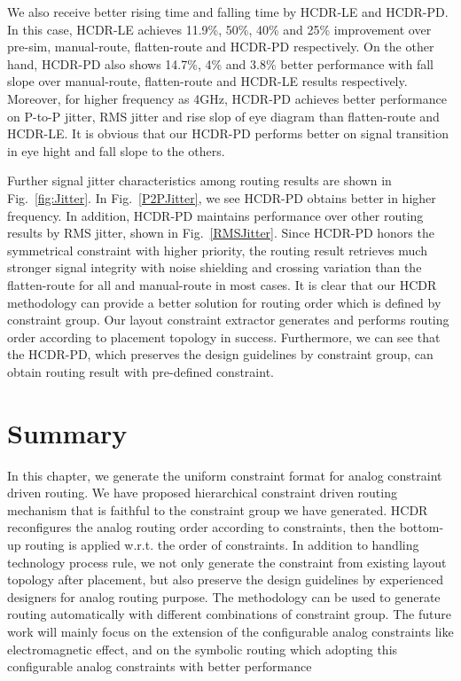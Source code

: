     We also receive better rising time and falling time by HCDR-LE and HCDR-PD. In this case, HCDR-LE achieves 11.9\%, 50\%, 40\% and 25\% improvement over pre-sim, manual-route, flatten-route and HCDR-PD respectively. On the other hand, HCDR-PD also shows 14.7\%, 4\% and 3.8\% better performance with fall slope over manual-route, flatten-route and HCDR-LE results respectively. Moreover, for higher frequency as 4GHz, HCDR-PD achieves better performance on P-to-P jitter, RMS jitter and rise slop of eye diagram than flatten-route and HCDR-LE. It is obvious that our HCDR-PD performs better on signal transition in eye hight and fall slope to the others. 
    
    Further signal jitter characteristics among routing results are shown in Fig.~\ref{fig:Jitter}. In Fig.~\ref{P2PJitter}, we see HCDR-PD obtains better in higher frequency. In addition, HCDR-PD maintains performance over other routing results by RMS jitter, shown in Fig.~\ref{RMSJitter}. Since HCDR-PD honors the symmetrical constraint with higher priority, the routing result retrieves much stronger signal integrity with noise shielding and crossing variation than the flatten-route for all and manual-route in most cases. It is clear that our HCDR methodology can provide a better solution for routing order which is defined by constraint group. Our layout constraint extractor generates and performs routing order according to placement topology in success. Furthermore, we can see that the HCDR-PD, which preserves the design guidelines by constraint group, can obtain routing result with pre-defined constraint.

  \section{Summary}\label{sec:CUCLMSum}

    In this chapter, we generate the uniform constraint format for analog constraint driven routing. We have proposed hierarchical constraint driven routing mechanism that is faithful to the constraint group we have generated. HCDR reconfigures the analog routing order according to constraints, then the bottom-up routing is applied w.r.t. the order of constraints. In addition to handling technology process rule, we not only generate the constraint from existing layout topology after placement, but also preserve the design guidelines by experienced designers for analog routing purpose. The methodology can be used to generate routing automatically with different combinations of constraint group. The future work will mainly focus on the extension of the configurable analog constraints like electromagnetic effect, and on the symbolic routing which adopting this configurable analog constraints with better performance

